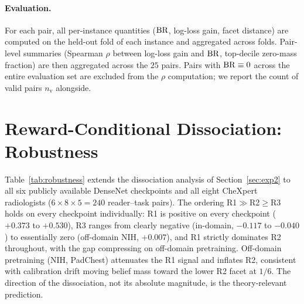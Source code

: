 \paragraph{Evaluation.}
For each pair, all per-instance quantities ($\operatorname{BR}$, log-loss gain, facet distance) are computed on the held-out fold of each instance and aggregated across folds.
Pair-level summaries (Spearman $\rho$ between log-loss gain and $\operatorname{BR}$, top-decile zero-mass fraction) are then aggregated across the $25$ pairs.
Pairs with $\operatorname{BR}\equiv 0$ across the entire evaluation set are excluded from the $\rho$ computation; we report the count of valid pairs $n_{\mathrm{v}}$ alongside.

\section{Reward-Conditional Dissociation: Robustness}
\label{app:exp2-robustness}

Table~\ref{tab:robustness} extends the dissociation analysis of Section~\ref{sec:exp2} to all six publicly available DenseNet checkpoints and all eight CheXpert radiologists ($6 \times 8 \times 5 = 240$ reader--task pairs).
The ordering R1${\gg}$R2${\geq}$R3 holds on every checkpoint individually: R1 is positive on every checkpoint ($+0.373$ to $+0.530$), R3 ranges from clearly negative (in-domain, $-0.117$ to $-0.040$) to essentially zero (off-domain NIH, $+0.007$), and R1 strictly dominates R2 throughout, with the gap compressing on off-domain pretraining.
Off-domain pretraining (NIH, PadChest) attenuates the R1 signal and inflates R2, consistent with calibration drift moving belief mass toward the lower R2 facet at $1/6$.
The direction of the dissociation, not its absolute magnitude, is the theory-relevant prediction.

